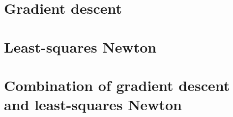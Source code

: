 \section{Gradient descent}

\section{Least-squares Newton}

\section{Combination of gradient descent and least-squares Newton}

